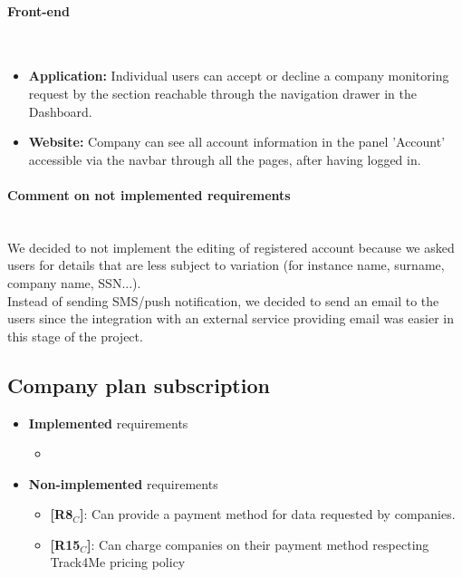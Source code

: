 \paragraph{Front-end} \mbox{}\\
\begin{itemize}
    \item \textbf{Application:} Individual users can accept or decline a company monitoring request by the section reachable through the navigation drawer in the Dashboard.\\
\item \textbf{Website:} Company can see all account information in the panel 'Account' accessible via the navbar through all the pages, after having logged in.\\
\end{itemize}

\paragraph{Comment on not implemented requirements} \mbox{}\\ 
We decided to not implement the editing of registered account because we asked users for details that are less subject to variation (for instance name, surname, company name, SSN...). \\
Instead of sending SMS/push notification, we decided to send an email to the users since the integration with an external service providing email was easier in this stage of the project.

\subsection{Company plan subscription }
\begin{itemize}
    \item \textbf{Implemented} requirements
        \begin{itemize}
            \item 
        \end{itemize}
    \item \textbf{Non-implemented} requirements
    \begin{itemize}
    \item \textbf{[R8$_C$]}: Can provide a payment method for data requested by companies.
    \item \textbf{[R15$_C$]}: Can charge companies on their payment method respecting Track4Me pricing policy
        \end{itemize}
\end{itemize}


